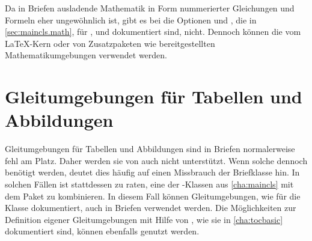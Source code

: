 \iffalse %
  Die \KOMAScript-Klassen stellen keine eigenen Umgebungen für mathematische
  Formeln, Gleichungssysteme oder ähnliche Elemente der Mathematik
  bereit. Stattdessen stützt sich \KOMAScript{} im Bereich der Mathematik voll
  und ganz auf den \LaTeX-Kern. Da\textnote{Achtung!} jedoch Mathematik in Form
  von nummerierten Gleichungen und Formeln in Briefen eher ungewöhnlich ist, %
  \iffalse %
  unterstützt \Class{scrlttr2} dies nicht aktiv. Daher gibt es auch %
  \else%
  gibt es bei \Class{scrlttr2} %
  \fi%
  nicht die Optionen \DescRef{maincls.option.leqno} und
  \DescRef{maincls.option.fleqn}, die in \autoref{sec:maincls.math},
  \autopageref{sec:maincls.math} für \Class{scrbook}, \Class{scrreprt} und
  \Class{scrartcl} dokumentiert sind.%
  \iffalse%
    \ Bei \Package{scrletter} ist für dergleichen ohnehin die verwendete
    Klasse zuständig.%
    \par
    Auf eine Beschreibung der Mathematikumgebungen des \LaTeX-Kerns, also
    \Environment{displaymath}\IndexEnv{displaymath},
    \Environment{equation}\IndexEnv{equation} und
    \Environment{eqnarray}\IndexEnv{eqnarray}, wird an dieser Stelle
    verzichtet. Wer diese verwenden möchte, sei auf \cite{l2kurz} verwiesen. Für
    mehr als nur einfachste mathematische Formeln und Gleichungen sei jedoch die
    Verwendung von \Package{amsmath}\IndexPackage{amsmath} empfohlen (siehe
    \cite{package:amsmath}).%
  \fi%
\else%
  Da in Briefen ausladende Mathematik in Form nummerierter Gleichungen und
  Formeln eher ungewöhnlich ist, gibt es bei  die Optionen
   und , die in
  \autoref{sec:maincls.math},  für
  ,  und  dokumentiert sind,
  nicht. Dennoch können die vom \LaTeX-Kern oder von Zusatzpaketen wie
   bereitgestellten
  Mathematikumgebungen verwendet werden.%
\fi%
%
\EndIndexGroup


\section{Gleitumgebungen für Tabellen und Abbildungen}

Gleitumgebungen für Tabellen und Abbildungen sind in Briefen normalerweise
fehl am Platz. Daher werden sie von  auch
nicht unterstützt. Wenn solche dennoch benötigt werden, deutet dies häufig auf
einen Missbrauch der Briefklasse hin. In solchen Fällen ist stattdessen zu
raten, eine der \KOMAScript-Klassen aus \autoref{cha:maincls} mit dem Paket
 zu kombinieren. In diesem
Fall können Gleitumgebungen, wie für die Klasse dokumentiert, auch in Briefen
verwendet werden. Die Möglichkeiten zur Definition eigener Gleitumgebungen mit
Hilfe von \hyperref[cha:tocbasic]{}%
, wie sie in
\autoref{cha:tocbasic} dokumentiert sind, können ebenfalls genutzt werden.


